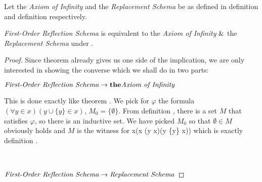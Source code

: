 
Let the \emph{Axiom of Infinity} and the \emph{Replacement Schema} be as defined in definition  and definition  respectively.

\begin{theorem}\label{theorem:levy_equivalence_contemporary}
\emph{First-Order Reflection Schema} is equivalent to the \emph{Axiom of Infinity} $ \mathrel{\&} $ the \emph{Replacement Schema} under .
\end{theorem}
\begin{proof}
Since theorem  already gives us one side of the implication, we are only interested in showing the converse which we shall do in two parts:
\bce[(i)]
\item $\bold{\emph{First-Order Reflection Schema} \rightarrow the \emph{Axiom of Infinity}}$

This is done exactly like theorem . We pick for $\varphi$ the formula $(\forall y \in x)(y \cup \{y\} \in x)$, $M_0 = \{\emptyset\}$. From definition , there is a set $M$ that satisfies $\varphi$, so there is an inductive set. We have picked $M_0$ so that $\emptyset \in M$ obviously holds and $M$ is the witness for 
\beq
\exists x(\emptyset \in x \et (\forall y \in x)(y \cup \{y\} \in x))
\eeq
which is exactly definition .

\

\item $\bold{\emph{First-Order Reflection Schema} \rightarrow \emph{Replacement Schema}}$



\end{proof}
